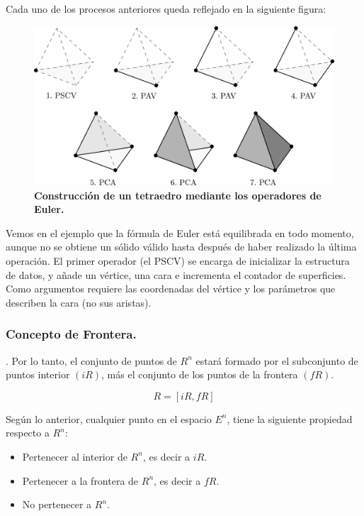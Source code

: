 Cada uno de los procesos anteriores queda reflejado en la siguiente figura:
\begin{figure}[h]
\includegraphics[width=12cm]{Img/GEO/geo-euler5.jpg}
\centering
\caption{\textbf{\footnotesize{Construcción de un tetraedro mediante los operadores de Euler.}}}
\end{figure}

Vemos en el ejemplo que la fórmula de Euler está equilibrada en todo momento, aunque no se obtiene un sólido válido hasta después de haber realizado la última operación. El primer operador (el PSCV) se encarga de inicializar la estructura de datos, y añade un vértice, una cara e incrementa el contador de superficies. Como argumentos requiere las coordenadas del vértice y los parámetros que describen la cara (no sus aristas).

\subsubsection{Concepto de Frontera. }

 \citep{Ramos2011}. Por lo tanto, el conjunto de puntos de $R^n$ estará formado por el subconjunto de puntos interior $(iR)$, más el conjunto de los puntos de la frontera $(fR)$.

\begin{equation}
R = [iR, fR]
\end{equation}

Según lo anterior, cualquier punto en el espacio $E^n$, tiene la siguiente propiedad respecto a $R^n$:

\begin{itemize}
\item Pertenecer al interior de $R^n$, es decir a $iR$. 
\item Pertenecer a la frontera de $R^n$, es decir a $fR$.
\item No pertenecer a $R^n$. 
\end{itemize}


